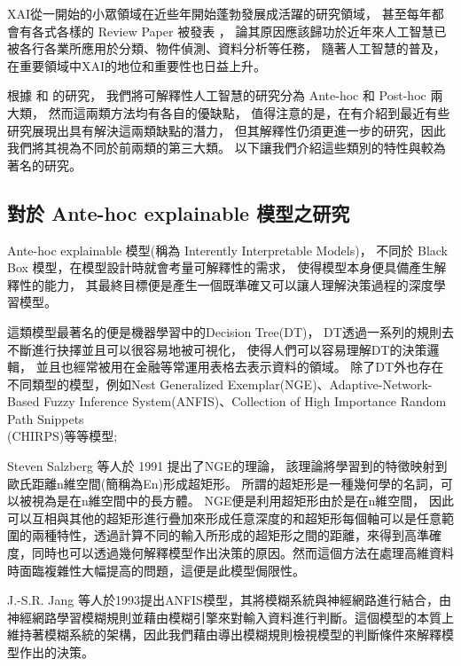 \documentclass[class=NCU_thesis, crop=false]{standalone}
\begin{document}
XAI從一開始的小眾領域在近些年開始蓬勃發展成活躍的研究領域，
甚至每年都會有各式各樣的 Review Paper 被發表\cite{A2023100230} \cite{10188681}，
論其原因應該歸功於近年來人工智慧已被各行各業所應用於分類、物件偵測、資料分析等任務，
隨著人工智慧的普及，在重要領域中XAI的地位和重要性也日益上升。

根據 \cite{Nielsen_2022} 和 \cite{LONGO2024102301} 的研究，
我們將可解釋性人工智慧的研究分為 Ante-hoc 和 Post-hoc 兩大類，
然而這兩類方法均有各自的優缺點，
值得注意的是，在\cite{LONGO2024102301}有介紹到最近有些研究展現出具有解決這兩類缺點的潛力，
但其解釋性仍須更進一步的研究，因此我們將其視為不同於前兩類的第三大類。
以下讓我們介紹這些類別的特性與較為著名的研究。

\subsection{對於 Ante-hoc explainable 模型之研究}
Ante-hoc explainable 模型(\cite{Nielsen_2022}稱為 Interently Interpretable Models)，
不同於 Black Box 模型，在模型設計時就會考量可解釋性的需求，
使得模型本身便具備產生解釋性的能力，
其最終目標便是產生一個既準確又可以讓人理解決策過程的深度學習模型。

這類模型最著名的便是機器學習中的Decision Tree(DT)\cite{rokach2016decision}，
DT透過一系列的規則去不斷進行抉擇並且可以很容易地被可視化，
使得人們可以容易理解DT的決策邏輯，
並且也經常被用在金融等常運用表格去表示資料的領域\cite{grinsztajn2022tree}。
除了DT外也存在不同類型的模型，例如Nest Generalized Exemplar(NGE)\cite{salzberg1991nearest}、Adaptive-Network-Based Fuzzy Inference System(ANFIS)\cite{256541}、Collection of High Importance Random Path Snippets\\(CHIRPS)\cite{hatwell2020chirps}等等模型;

Steven Salzberg 等人於 1991 提出了NGE\cite{salzberg1991nearest}的理論，
該理論將學習到的特徵映射到歐氏距離n維空間(簡稱為En)形成超矩形。
所謂的超矩形是一種幾何學的名詞，可以被視為是在n維空間中的長方體。
NGE便是利用超矩形由於是在n維空間，
因此可以互相與其他的超矩形進行疊加來形成任意深度的和超矩形每個軸可以是任意範圍的兩種特性，透過計算不同的輸入所形成的超矩形之間的距離，來得到高準確度，同時也可以透過幾何解釋模型作出決策的原因。然而這個方法在處理高維資料時面臨複雜性大幅提高的問題，這便是此模型侷限性。

J.-S.R. Jang 等人於1993提出ANFIS模型\cite{256541}，其將模糊系統與神經網路進行結合，由神經網路學習模糊規則並藉由模糊引擎來對輸入資料進行判斷。這個模型的本質上維持著模糊系統的架構，因此我們藉由導出模糊規則檢視模型的判斷條件來解釋模型作出的決策。
\end{document}
